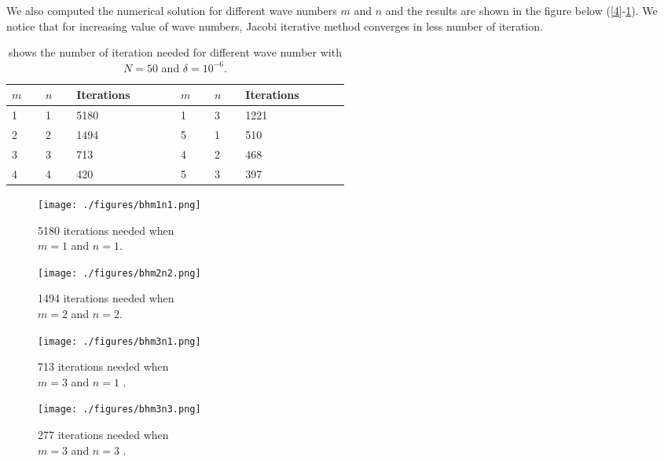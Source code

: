 We also computed the numerical solution for different wave numbers $m$ and $n$ and the results are shown in the figure below (\ref{4}-\ref{7}). We notice that for increasing value of wave numbers, Jacobi iterative method converges in less number of iteration.\\
\begin{table*}[h]
\centering
\begin{tabular}{|p{0.05\linewidth}p{0.05\linewidth}p{0.15\linewidth}|p{0.05\linewidth}p{0.05\linewidth}p{0.15\linewidth}|}
\hline
$m$ & $n$  & Iterations & $m$ & $n$  & Iterations\\
\hline
1 & 1 & 5180 & 1 & 3 & 1221\\
2 & 2 & 1494 & 5 & 1 & 510\\
3 & 3 & 713  & 4 & 2 & 468\\
4 & 4 & 420  & 5 & 3 & 397\\
\hline
\end{tabular}
\caption{shows the number of iteration needed for different wave number with $N = 50$ and $\delta = 10^{-6}$.}
\end{table*}
\begin{figure}[htb]
\footnotesize
\begin{minipage}[h]{.5\textwidth }
\texttt{[image: ./figures/bhm1n1.png]}
\caption{5180 iterations needed when \\$m =1$ and $n =1$.}
\label{4}
\end{minipage}
\begin{minipage}[htb]{.5\textwidth}
\texttt{[image: ./figures/bhm2n2.png]}
\caption{1494 iterations needed when\\ $m = 2$ and $n = 2$. }
\end{minipage}
\begin{minipage}[h]{.5\textwidth}
\texttt{[image: ./figures/bhm3n1.png]}
\caption{713 iterations needed when\\ $m = 3$ and $n = 1$ .}
\end{minipage}
\begin{minipage}[h]{.5\textwidth}
\texttt{[image: ./figures/bhm3n3.png]}
\caption{277 iterations needed when \\ $m = 3$ and $n = 3$ .}
\label{7}
\end{minipage}
\end{figure}


